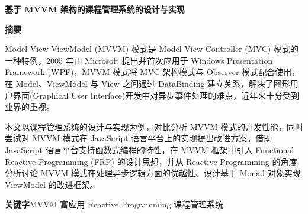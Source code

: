 \begin{center}
	\heiti{}\textbf{基于 MVVM 架构的课程管理系统的设计与实现}
\end{center}
\begin{center}
	\heiti{}\textbf{摘\quad 要}
\end{center}
\vspace{2.5mm}
\songti{}

Model-View-ViewModel (MVVM) 模式是 Model-View-Controller (MVC) 模式的一种特例，2005 年由 Microsoft 提出并首次应用于 Windows Presentation Framework (WPF)，MVVM 模式将 MVC 架构模式与 Observer 模式配合使用，在 Model、ViewModel 与 View 之间通过 DataBinding 建立关系，解决了图形用户界面(Graphical User Interface)开发中对异步事件处理的难点，近年来十分受到业界的重视。

本文以课程管理系统的设计与实现为例，对比分析 MVVM 模式的开发性能，同时尝试对 MVVM 模式在 JavaScript 语言平台上的实现提出改进方案。借助 JavaScript 语言平台支持函数式编程的特性，在 MVVM 框架中引入 Functional Reactive Programming (FRP) 的设计思想，并从 Reactive Programming 的角度分析讨论 MVVM 模式在处理异步逻辑方面的优越性、设计基于 Monad 对象实现 ViewModel 的改进框架。

\vspace{3mm}
\heiti\textbf{关键字}\quad \songti MVVM \quad 富应用 \quad Reactive Programming \quad 课程管理系统

